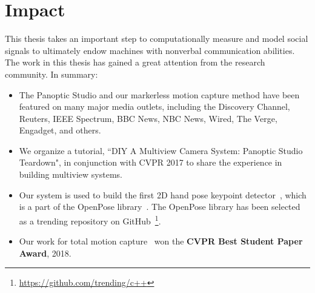







\section{Impact}

This thesis takes an important step to computationally measure and model social signals to ultimately endow machines with nonverbal communication abilities. The work in this thesis has gained a great attention from the research community. In summary:

\begin{itemize}
	\item The Panoptic Studio and our markerless motion capture method have been featured on many major media outlets, including the Discovery Channel, Reuters, IEEE Spectrum, BBC News, NBC News, Wired, The Verge, Engadget, and others.
	
	\item We organize a tutorial, ``DIY A Multiview Camera System: Panoptic Studio Teardown", in conjunction with CVPR 2017 to share the experience in building multiview systems.  
	
	\item Our system is used to build the first 2D hand pose keypoint detector~\cite{simon2017hand}, which is a part of the OpenPose library~\cite{openpose}. The OpenPose library has been selected as a trending repository on GitHub~\footnote{\url{https://github.com/trending/c++}}.
	
	
	\item Our work for total motion capture~\cite{joo2018} won the \textbf{CVPR Best Student Paper Award}, 2018.
\end{itemize}


